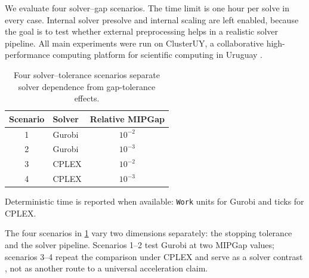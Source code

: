 \documentclass[AMA,Times1COL]{WileyNJDv5} %
\newcommand{\Work}{\texttt{Work}}
\providecommand{\DIFadd}[1]{{\protect\color{blue} \sf #1}} %
\providecommand{\DIFdel}[1]{{\protect\color{red} \scriptsize #1}} %
\providecommand{\DIFaddbegin}{} %
\providecommand{\DIFaddend}{} %
\providecommand{\DIFdelbegin}{} %
\providecommand{\DIFdelend}{} %
\begin{document}
\DIFaddend We evaluate four solver--gap scenarios. The time limit is one hour per solve in every
case. Internal solver presolve and internal scaling are left enabled, because the goal is
to test whether external preprocessing helps in a realistic solver pipeline. All main
experiments were run on ClusterUY, a collaborative high-performance computing
platform for scientific computing in Uruguay \DIFdelbegin \DIFdel{\citep{nesmachnow2019clusteruy}}\DIFdelend \DIFaddbegin \DIFadd{\cite{nesmachnow2019clusteruy}}\DIFaddend .

\begin{table}[t]
\centering
\caption{Four solver--tolerance scenarios separate solver dependence from gap-tolerance effects.}
\label{tab:solver-scenarios}
\begin{threeparttable}
\small
\begin{tabular}{@{}clc@{}}
\toprule
Scenario & Solver & Relative MIPGap \\
\midrule
1 & Gurobi & $10^{-2}$ \\
2 & Gurobi & $10^{-3}$ \\
3 & CPLEX  & $10^{-2}$ \\
4 & CPLEX  & $10^{-3}$ \\
\bottomrule
\end{tabular}
\begin{tablenotes}[flushleft]\footnotesize
\item Deterministic time is reported when available: \Work{} units for Gurobi and ticks
for CPLEX.
\end{tablenotes}
\end{threeparttable}
\end{table}

\noindent The four scenarios \DIFaddbegin \DIFadd{in \cref{tab:solver-scenarios} }\DIFaddend vary two dimensions separately: the stopping tolerance and the solver pipeline. Scenarios 1--2 test Gurobi at two MIPGap values; scenarios 3--4 repeat the comparison under CPLEX and serve as a solver contrast\DIFdelbegin \DIFdel{, not as another route to a universal acceleration claim}\DIFdelend .
\end{document}
